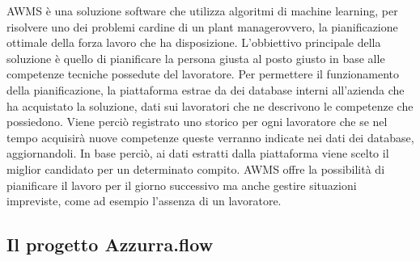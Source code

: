 \gls{AWMS} è una soluzione software che utilizza algoritmi di \gls{machine learning}\glsfirstoccur, per risolvere uno dei problemi cardine di un \gls{plant manager}\glsfirstoccur ovvero, la pianificazione ottimale della forza lavoro che ha disposizione. L'obbiettivo principale della soluzione è quello di pianificare la persona giusta al posto giusto in base alle competenze tecniche possedute del lavoratore. Per permettere il funzionamento della pianificazione, la piattaforma estrae da dei database interni all'azienda che ha acquistato la soluzione, dati sui lavoratori che ne descrivono le competenze che possiedono. Viene perciò registrato uno storico per ogni lavoratore che se nel tempo acquisirà nuove competenze queste verranno indicate nei dati dei database, aggiornandoli. In base perciò, ai dati estratti dalla piattaforma viene scelto il miglior candidato per un determinato compito. \gls{AWMS} offre la possibilità di pianificare il lavoro per il giorno successivo ma anche gestire situazioni impreviste, come ad esempio l'assenza di un lavoratore.

\subsection{Il progetto Azzurra.flow}

